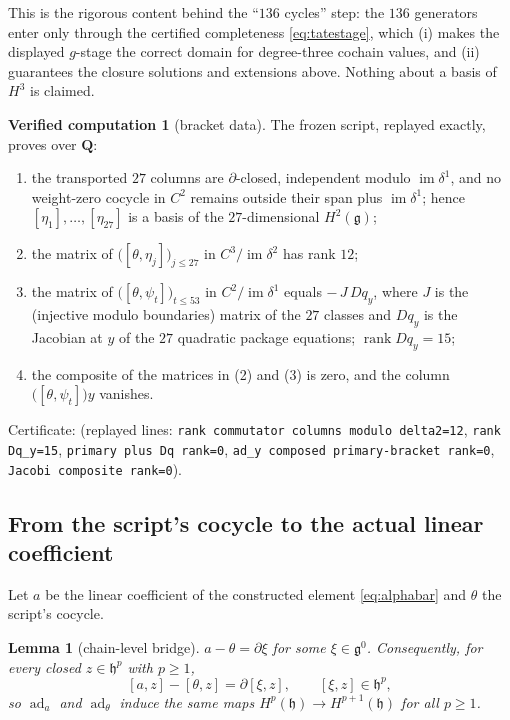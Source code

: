 \documentclass[11pt]{article}
\newtheorem{lemma}[theorem]{Lemma}
\theoremstyle{definition}
\newtheorem{computation}[theorem]{Verified computation}
\theoremstyle{remark}
\newcommand{\QQ}{\mathbf Q}
\newcommand{\im}{\operatorname{im}}
\newcommand{\rank}{\operatorname{rank}}
\newcommand{\ad}{\operatorname{ad}}
\newcommand{\g}{\mathfrak g}
\newcommand{\h}{\mathfrak h}
\begin{document}
This is the rigorous content behind the ``$136$ cycles'' step: the $136$
generators enter only through the certified completeness
\eqref{eq:tatestage}, which (i) makes the displayed $g$-stage the correct
domain for degree-three cochain values, and (ii) guarantees the closure
solutions and extensions above.  Nothing about a basis of $H^3$ is claimed.

\begin{computation}[bracket data]\label{comp:bracket}
The frozen script, replayed exactly, proves over $\QQ$:
\begin{enumerate}
\item the transported $27$ columns are $\partial$-closed, independent
modulo $\im\delta^1$, and no weight-zero cocycle in $C^2$ remains outside
their span plus $\im\delta^1$; hence $[\eta_1],\ldots,[\eta_{27}]$ is a
basis of the $27$-dimensional $H^2(\g)$;
\item the matrix of $\bigl([\theta,\eta_j]\bigr)_{j\le 27}$ in
$C^3/\im\delta^2$ has rank $12$;
\item the matrix of $\bigl([\theta,\psi_t]\bigr)_{t\le53}$ in
$C^2/\im\delta^1$ equals $-\,J\,Dq_y$, where $J$ is the (injective modulo
boundaries) matrix of the $27$ classes and $Dq_y$ is the Jacobian at $y$ of
the $27$ quadratic package equations; $\rank Dq_y=15$;
\item the composite of the matrices in \textup{(2)} and \textup{(3)} is
zero, and the column $\bigl([\theta,\psi_t]\bigr)y$ vanishes.
\end{enumerate}
Certificate: 
(replayed lines: \texttt{rank commutator columns modulo delta2=12},
\texttt{rank Dq\_y=15}, \texttt{primary plus Dq rank=0},
\texttt{ad\_y composed primary-bracket rank=0},
\texttt{Jacobi composite rank=0}).
\end{computation}

\subsection{From the script's cocycle to the actual linear coefficient}

Let $a$ be the linear coefficient of the constructed element
\eqref{eq:alphabar} and $\theta$ the script's cocycle.

\begin{lemma}[chain-level bridge]\label{lem:bridge}
$a-\theta=\partial\xi$ for some $\xi\in\g^0$.  Consequently, for every
closed $z\in\h^p$ with $p\geq1$,
\[
 [a,z]-[\theta,z]=\partial[\xi,z],
 \qquad [\xi,z]\in\h^p,
\]
so $\ad_a$ and $\ad_\theta$ induce the same maps
$H^p(\h)\to H^{p+1}(\h)$ for all $p\geq1$.
\end{lemma}
\end{document}
